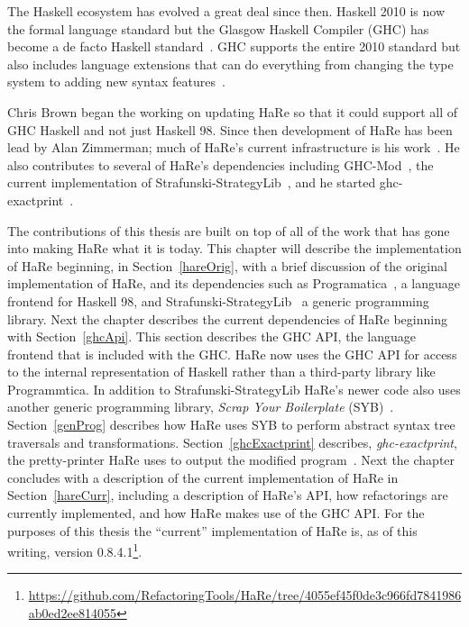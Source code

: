 	The Haskell ecosystem has evolved a great deal since then. Haskell 2010 is now the formal language standard but the Glasgow Haskell Compiler (GHC) has become a de facto Haskell standard~\citep{refacTools}. GHC supports the entire 2010 standard but also includes language extensions that can do everything from changing the type system to adding new syntax features~\citep{langExts}. 
	
	Chris Brown began the working on updating HaRe so that it could support all of GHC Haskell and not just Haskell 98. Since then development of HaRe has been lead by Alan Zimmerman; much of HaRe's current infrastructure is his work~\citep{hareCurrent}. He also contributes to several of HaRe's dependencies including GHC-Mod~\citep{ghcMod}, the current implementation of Strafunski-StrategyLib~\citep{strafunskiGit}, and he started ghc-exactprint~\citep{exactprint}.
	
	The contributions of this thesis are built on top of all of the work that has gone into making HaRe what it is today. This chapter will describe the implementation of HaRe beginning, in Section~\ref{hareOrig}, with a brief discussion of the original implementation of HaRe, and its dependencies such as Programatica~\citep{programatica}, a language frontend for Haskell 98, and Strafunski-StrategyLib~\citep{strafunski} a generic programming library. Next the chapter describes the current dependencies of HaRe beginning with Section~\ref{ghcApi}. This section describes the GHC API, the language frontend that is included with the GHC. HaRe now uses the GHC API for access to the internal representation of Haskell rather than a third-party library like Programmtica. In addition to Strafunski-StrategyLib HaRe's newer code also uses another generic programming library, \textit{Scrap Your Boilerplate} (SYB)~\citep{syb}. Section~\ref{genProg} describes how HaRe uses SYB to perform abstract syntax tree traversals and transformations. Section~\ref{ghcExactprint} describes, \textit{ghc-exactprint}, the pretty-printer HaRe uses to output the modified program~\citep{exactprint}. Next the chapter concludes with a description of the current implementation of HaRe in Section~\ref{hareCurr}, including a description of HaRe's API, how refactorings are currently implemented, and how HaRe makes use of the GHC API. For the purposes of this thesis the ``current'' implementation of HaRe is, as of this writing, version 0.8.4.1\footnote{\url{https://github.com/RefactoringTools/HaRe/tree/4055ef45f0de3c966fd7841986ab0ed2ee814055}}.

